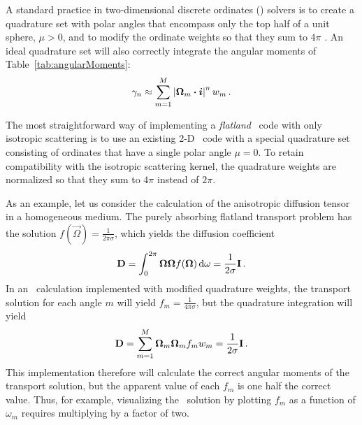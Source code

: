 A standard practice in two-dimensional discrete ordinates (\SN) solvers is to
create a quadrature set with polar angles that encompass only the top half of a
unit sphere, $\mu>0$, and to modify the ordinate weights so that they sum to
$4\pi$
\cite{Zik1997}. An ideal quadrature set will also correctly integrate the
angular moments of Table~\ref{tab:angularMoments}:
\begin{equation*}
  \gamma_n \approx \sum_{m=1}^{M} \left|  \bm{\Omega}_m \bm{\cdot} \bm{i} \right|^n w_m\,.
\end{equation*}

The most straightforward way of implementing a \emph{flatland} \SN\
code with only isotropic scattering is to use an existing 2-D \SN\ code with a
special quadrature set
consisting of ordinates that have a single
polar angle $\mu=0$. To retain compatibility with the isotropic scattering
kernel, the quadrature weights are normalized so that they sum to $4\pi$
instead of $2\pi$.

As an example, let us consider the calculation of the anisotropic diffusion tensor
in a homogeneous medium.  The purely absorbing flatland transport problem has the
solution $f(\vec{\Omega}) = \frac{1}{2\pi\sigma}$, which yields the diffusion
coefficient
\begin{equation*}
  \mathbf{D} = \int_{0}^{2\pi} \bm{\Omega}\bm{\Omega} f(\bm{\Omega}) \mathop{}\!\mathrm{d} \omega
  = \frac{1}{2\sigma} \mathbf{I} \,.
\end{equation*}
In an \SN\ calculation implemented with modified quadrature weights, the
transport solution for each angle $m$ will yield $f_m = \frac{1}{4\pi\sigma}$,
but the quadrature integration will yield
\begin{equation*}
  \mathbf{D} = \sum_{m=1}^{M} \bm{\Omega}_m \bm{\Omega}_m f_m  w_m 
  = \frac{1}{2\sigma} \mathbf{I} \,.
\end{equation*}
This implementation therefore will calculate the correct angular moments of
the transport solution, but the apparent value of each $f_m$ is one half 
the correct value. Thus, for example, visualizing the \SN\
solution by plotting $f_m$ as a function of $\omega_m$ requires multiplying by a
factor of two.


